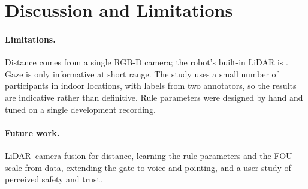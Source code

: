 \section{Discussion and Limitations}
\label{sec:discussion}


\paragraph{Limitations.} Distance comes from a single RGB-D camera; the
robot's built-in LiDAR is . Gaze is only informative
at short range. The study uses a small number of participants in
 indoor locations, with labels from two annotators, so the results are
indicative rather than definitive. Rule parameters were designed by hand and
tuned on a single development recording.

\paragraph{Future work.} LiDAR--camera fusion for distance, learning the rule
parameters and the FOU scale from data, extending the gate to voice and
pointing, and a user study of perceived safety and trust.
